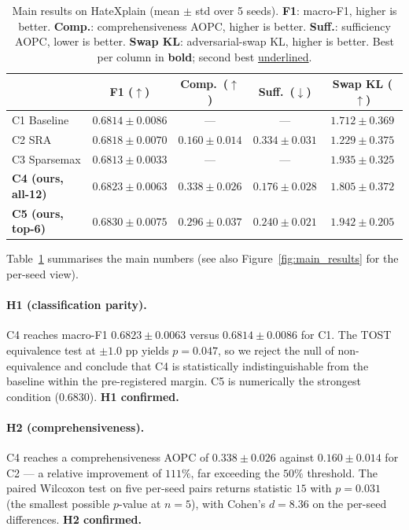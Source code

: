 \documentclass{article}
\begin{document}
\begin{table}[t]
\centering
\caption{Main results on HateXplain (mean $\pm$ std over 5 seeds). \textbf{F1}: macro-F1,
higher is better. \textbf{Comp.}: comprehensiveness AOPC, higher is better.
\textbf{Suff.}: sufficiency AOPC, lower is better. \textbf{Swap KL}: adversarial-swap
KL, higher is better. Best per column in \textbf{bold}; second best \underline{underlined}.}
\label{tab:main_results}
\small
\begin{tabular}{lcccc}
\toprule
& \textbf{F1 ($\uparrow$)} & \textbf{Comp.\ ($\uparrow$)} & \textbf{Suff.\ ($\downarrow$)} & \textbf{Swap KL ($\uparrow$)} \\
\midrule
C1 Baseline       & $0.6814 \pm 0.0086$ & ---                 & ---                 & $1.712 \pm 0.369$ \\
C2 SRA            & $0.6818 \pm 0.0070$ & $0.160 \pm 0.014$    & $0.334 \pm 0.031$    & $1.229 \pm 0.375$ \\
C3 Sparsemax      & $0.6813 \pm 0.0033$ & ---                 & ---                 & \underline{$1.935 \pm 0.325$} \\
\textbf{C4 (ours, all-12)} & \underline{$0.6823 \pm 0.0063$} & $\mathbf{0.338 \pm 0.026}$ & $\mathbf{0.176 \pm 0.028}$ & $1.805 \pm 0.372$ \\
\textbf{C5 (ours, top-6)}  & $\mathbf{0.6830 \pm 0.0075}$ & \underline{$0.296 \pm 0.037$} & \underline{$0.240 \pm 0.021$} & $\mathbf{1.942 \pm 0.205}$ \\
\bottomrule
\end{tabular}
\end{table}

Table~\ref{tab:main_results} summarises the main numbers (see also
Figure~\ref{fig:main_results} for the per-seed view).

\paragraph{H1 (classification parity).} C4 reaches macro-F1 $0.6823 \pm 0.0063$ versus
$0.6814 \pm 0.0086$ for C1. The TOST equivalence test at $\pm 1.0$ pp yields $p{=}0.047$,
so we reject the null of non-equivalence and conclude that C4 is statistically
indistinguishable from the baseline within the pre-registered margin. C5 is numerically
the strongest condition ($0.6830$). \textbf{H1 confirmed.}

\paragraph{H2 (comprehensiveness).} C4 reaches a comprehensiveness AOPC of $0.338 \pm 0.026$
against $0.160 \pm 0.014$ for C2 --- a relative improvement of $111\%$, far exceeding the
$50\%$ threshold. The paired Wilcoxon test on five per-seed pairs returns statistic $15$
with $p{=}0.031$ (the smallest possible $p$-value at $n{=}5$), with Cohen's $d{=}8.36$
on the per-seed differences. \textbf{H2 confirmed.}
\end{document}
